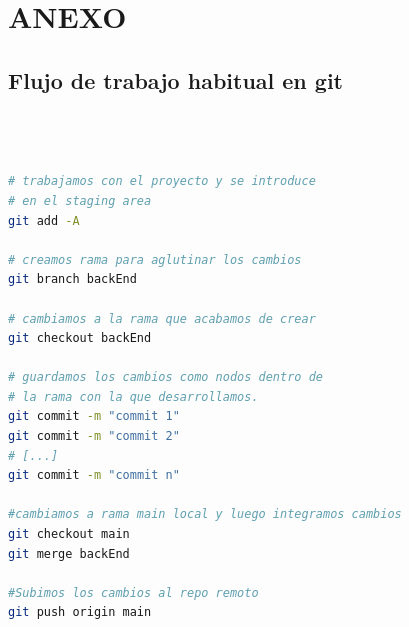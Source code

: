 \documentclass[a4paper,12pt]{report}
\begin{document}
	
	

	
	
	
	
	
	
	
	
	
	
	
	
	
	
	
	
	
	
	
	
	
	
	
	
	
	
	
	
	
	
	
	
	
	
	
	
	
	
	
	
	\chapter{ANEXO}
	\label{chap:anexo} %
		
			
		\section{Flujo de trabajo habitual en git}
		\label{sec:anexoFlujoGit}
		
\begin{lstlisting}[language=bash, basicstyle=\ttfamily\small]
	


# trabajamos con el proyecto y se introduce
# en el staging area
git add -A 

# creamos rama para aglutinar los cambios
git branch backEnd

# cambiamos a la rama que acabamos de crear
git checkout backEnd

# guardamos los cambios como nodos dentro de
# la rama con la que desarrollamos.	
git commit -m "commit 1"  	
git commit -m "commit 2"
# [...]
git commit -m "commit n"

#cambiamos a rama main local y luego integramos cambios
git checkout main
git merge backEnd

#Subimos los cambios al repo remoto
git push origin main 

	
\end{lstlisting}
		
	
\pagebreak

		
		
\end{document}
